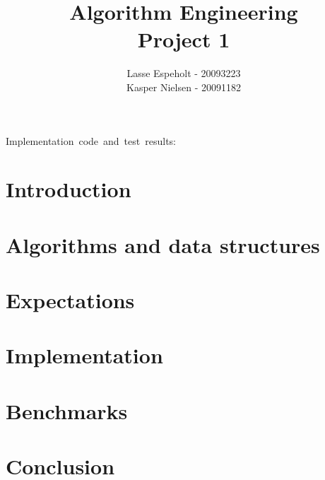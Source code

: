 \documentclass[a4paper]{article}
\begin{document}
\title{Algorithm Engineering\\Project 1}

\author{Lasse Espeholt - 20093223\\
Kasper Nielsen - 20091182}

\maketitle
\vfill{}

\begin{description}
\item [{Implementation~code~and~test~results:}] %
\end{description}
\pagebreak{}\tableofcontents{}\pagebreak{}


\section{Introduction}


	
\section{Algorithms and data structures}



\section{Expectations}



\section{Implementation}



\section{Benchmarks}



\section{Conclusion}


\end{document}
